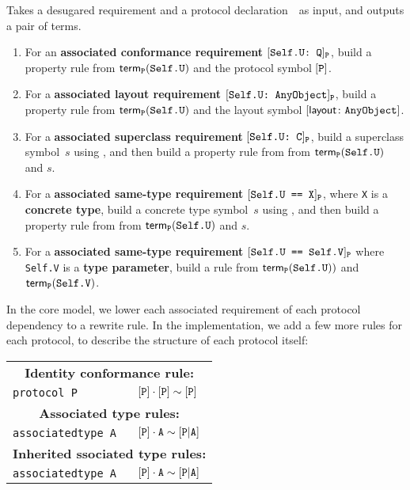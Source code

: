 \documentclass[../generics]{subfiles}
\begin{document}
\begin{algorithm}\label{build rule protocol}
Takes a desugared requirement and a protocol declaration~\tP\ as input, and outputs a pair of terms.
\begin{enumerate}
\item For an \textbf{associated conformance requirement} $[\texttt{Self.U:~Q}]_{\texttt{P}}$, build a property rule from $\mathsf{term}_{\texttt{P}}(\texttt{Self.U})$ and the protocol symbol $[\texttt{P}]$.
\item For a \textbf{associated layout requirement} $[\texttt{Self.U:~AnyObject}]_{\texttt{P}}$, build a property rule from $\mathsf{term}_{\texttt{P}}(\texttt{Self.U})$ and the layout symbol $[\mathsf{layout}\colon\texttt{AnyObject}]$.
\item For a \textbf{associated superclass requirement} $[\texttt{Self.U:~C}]_{\texttt{P}}$, build a superclass symbol~$s$ using , and then build a property rule from from $\mathsf{term}_{\texttt{P}}(\texttt{Self.U})$ and $s$.
\item For a \textbf{associated same-type requirement} $[\texttt{Self.U == X}]_{\texttt{P}}$, where \texttt{X} is a \textbf{concrete type}, build a concrete type symbol~$s$ using , and then build a property rule from from $\mathsf{term}_{\texttt{P}}(\texttt{Self.U})$ and $s$.
\item For a \textbf{associated same-type requirement} $[\texttt{Self.U == Self.V}]_{\texttt{P}}$ where \texttt{Self.V} is a \textbf{type parameter}, build a rule from $\mathsf{term}_{\texttt{P}}(\texttt{Self.U}))$ and $\mathsf{term}_{\texttt{P}}(\texttt{Self.V})$.
\end{enumerate}
\end{algorithm}

In the core model, we lower each associated requirement of each protocol dependency to a rewrite rule. In the implementation, we add a few more rules for each protocol, to describe the structure of each protocol itself:
\begin{center}
\begin{tabular}{ll}
\toprule
\multicolumn{2}{c}{\textbf{Identity conformance rule:}}\\
\texttt{protocol P} & $[\texttt{P}]\cdot[\texttt{P}] \sim [\texttt{P}]$\\
\midrule
\multicolumn{2}{c}{\textbf{Associated type rules:}}\\
\texttt{associatedtype A} & $[\texttt{P}]\cdot\texttt{A} \sim [\texttt{P}|\texttt{A}]$\\
\midrule
\multicolumn{2}{c}{\textbf{Inherited ssociated type rules:}}\\
\texttt{associatedtype A} & $[\texttt{P}]\cdot\texttt{A} \sim [\texttt{P}|\texttt{A}]$\\
\bottomrule
\end{tabular}
\end{center}
\end{document}
